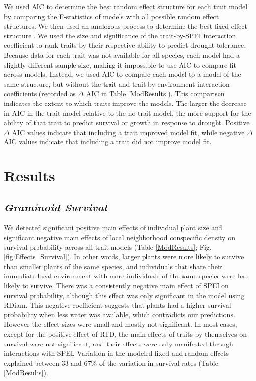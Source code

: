 \documentclass[12pt, letterpaper]{article}
\begin{document}
We used AIC to determine the best random effect structure for each trait model by comparing the F-statistics of models with all possible random effect structures. 
We then used an analogous process to determine the best fixed effect structure \citep{Bolker2009}. We used the size and significance of the trait-by-SPEI interaction coefficient to rank traits by their respective ability to predict drought tolerance. Because data for each trait was not available for all species, each model had a slightly different sample size, making it impossible to use AIC to compare fit across models. Instead, we used AIC to compare each model to a model of the same structure, but without the trait and trait-by-environment interaction coefficients (recorded as $\Delta$ AIC in Table \ref{ModResults}). This comparison indicates the extent to which traits improve the models. The larger the decrease in AIC in the trait model relative to the no-trait model, the more support for the ability of that trait to predict survival or growth in response to drought. Positive $\Delta$ AIC values indicate that including a trait improved model fit, while negative $\Delta$ AIC values indicate that including a trait did not improve model fit.

\section{Results}
\subsection{\textit{Graminoid Survival}} We detected significant positive main effects of individual plant size and significant negative main effects of local neighborhood conspecific density on survival probability across all trait models (Table \ref{ModResults}; Fig. \ref{fig:Effects_Survival}). In other words, larger plants were more likely to survive than smaller plants of the same species, and individuals that share their immediate local environment with more individuals of the same species were less likely to survive. There was a consistently negative main effect of SPEI on survival probability, although this effect was only significant in the model using RDiam. This negative coefficient suggests that plants had a higher survival probability when less water was available, which contradicts our predictions. However the effect sizes were small and mostly not significant. In most cases, except for the positive effect of RTD, the main effects of traits by themselves on survival were not significant, and their effects were only manifested through interactions with SPEI. Variation in the modeled fixed and random effects explained between 33 and 67\% of the variation in survival rates (Table \ref{ModResults}). 
\end{document}
